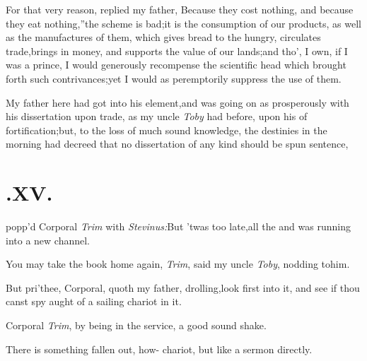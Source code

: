 \documentclass{article}
\begin{document}
For that very reason, replied my father,
\lqq Because they cost nothing, and\break
\lqq because they eat nothing,”\tsk the scheme\break
is bad;\tsk it is the
consumption of our products, as well as the manufactures of them,
which gives bread to the hungry, circulates trade,\tsk brings in
money, and supports the value of our lands;\tsk and tho’, I
own, if I was a prince, I would
ge\-nerously recompense the scientific head which brought
forth such contrivances;\break\tsk yet I
would as peremptorily suppress the use of them.

My father here had got into his element,\tsh and was going on
as pros\-per\-ously with his dissertation upon trade, as my uncle
\textit{Toby} had before, upon his\break 
of fortification;\tsh but, to the loss\break
of much sound knowledge, the destinies in the morning had
decreed that no
dissertation of any kind should be spun
\break sentence,

\null
\section{.\enspace  XV.}

 popp’d Corporal \textit{Trim} with
\textit{Stevinus:}\tsk But ’twas too late,\tsk all the\break
{}
and was running into a new channel.

\tsk You may take the book home again, \textit{Trim}, said my
uncle \textit{Toby}, nodding to\break him.

But pri’thee, Corporal, quoth my father, drolling,\tsk look
first into it, and see if thou canst spy aught of a
sailing\break
chariot in it.

Corporal \textit{Trim}, by being in the service,\break
{}
a good sound shake.

There is something fallen out, how-
chariot, but like a sermon directly.
\end{document}
